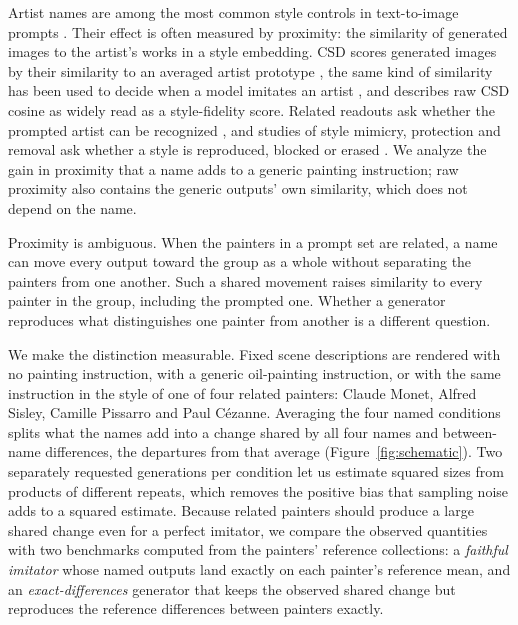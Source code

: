 \documentclass[10pt]{article}
\begin{document}
Artist names are among the most common style controls in text-to-image prompts
\citep{wang2023diffusiondb}. Their effect is often measured by proximity: the similarity of
generated images to the artist's works in a style embedding. CSD scores generated images by their
similarity to an averaged artist prototype \citep{somepalli2024style}, the same kind of similarity
has been used to decide when a model imitates an artist \citep{verma2025imitation}, and
\citet{frochte2026csd} describes raw CSD cosine as widely read as a style-fidelity score. Related
readouts ask whether the prompted artist can be recognized
\citep{casper2023measuring,su2025prompted,moayeri2025rethinking}, and studies of style mimicry,
protection and removal ask whether a style is reproduced, blocked or erased
\citep{shan2023glaze,honig2025adversarial,gandikota2023erasing,kumari2023ablating,zhang2024unlearncanvas}.
We analyze the gain in proximity that a name adds to a generic painting instruction; raw proximity
also contains the generic outputs' own similarity, which does not depend on the name.

Proximity is ambiguous. When the painters in a prompt set are related, a name can move every
output toward the group as a whole without separating the painters from one another. Such a shared
movement raises similarity to every painter in the group, including the prompted one. Whether a
generator reproduces what distinguishes one painter from another is a different question.

We make the distinction measurable. Fixed scene descriptions are rendered with no painting
instruction, with a generic oil-painting instruction, or with the same instruction in the style
of one of four related painters: Claude Monet, Alfred Sisley, Camille Pissarro and Paul
C\'ezanne. Averaging the four named conditions splits what the names add into a change shared
by all four names and between-name differences, the departures from that average
(Figure~\ref{fig:schematic}). Two separately requested generations per condition let us
estimate squared sizes from products of different repeats, which removes the positive bias that
sampling noise adds to a squared estimate. Because related painters should produce a large
shared change even for a perfect imitator, we compare the observed quantities with two
benchmarks computed from the painters' reference collections: a \emph{faithful imitator} whose
named outputs land exactly on each painter's reference mean, and an \emph{exact-differences}
generator that keeps the observed shared change but reproduces the reference differences
between painters exactly.
\end{document}
